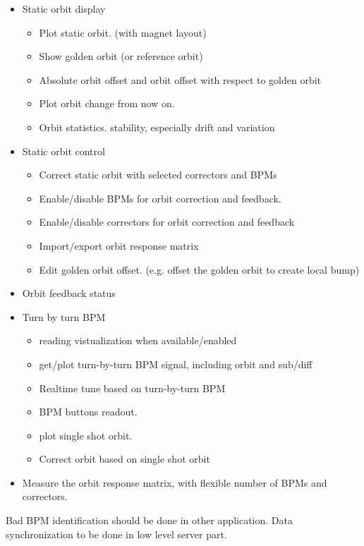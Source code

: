 \documentclass[11pt,oneside,letterpaper,showtrims,article]{memoir}
\begin{document}
\begin{itemize}
\item Static orbit display
  \begin{itemize}%
  \item Plot static orbit. (with magnet layout)
  \item Show golden orbit (or reference orbit)
  \item Absolute orbit offset and orbit offset with respect to golden orbit
  \item Plot orbit change from now on.
  \item Orbit statistics. stability, especially drift and variation
  \end{itemize}
\item Static orbit control
  \begin{itemize}%
  \item Correct static orbit with selected correctors and BPMs
  \item Enable/disable BPMs for orbit correction and feedback.
  \item Enable/disable correctors for orbit correction and feedback
  \item Import/export orbit response matrix
  \item Edit golden orbit offset. (e.g. offset the golden orbit to create local bump)
  \end{itemize}
\item Orbit feedback status
\item Turn by turn BPM
  \begin{itemize}%
  \item reading vistualization when available/enabled
  \item get/plot turn-by-turn BPM signal, including orbit and sub/diff
  \item Realtime tune based on turn-by-turn BPM
  \item BPM buttons readout.
  \item plot single shot orbit.
  \item Correct orbit based on single shot orbit
  \end{itemize}
\item Measure the orbit response matrix, with flexible number of BPMs
  and correctors.
\end{itemize}

Bad BPM identification should be done in other application. Data
synchronization to be done in low level server part.
\end{document}
